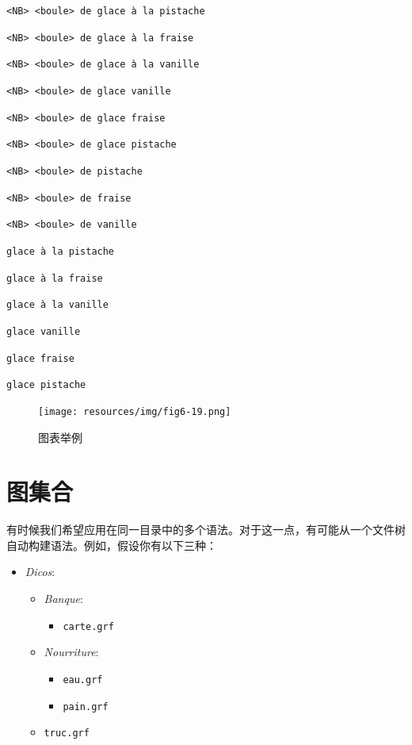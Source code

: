 \bigskip
\noindent
\texttt{<NB> <boule> de glace \`a la pistache}

\noindent
\texttt{<NB> <boule> de glace \`a la fraise}

\noindent
\texttt{<NB> <boule> de glace \`a la vanille}

\noindent
\texttt{<NB> <boule> de glace vanille}

\noindent
\texttt{<NB> <boule> de glace fraise}

\noindent
\texttt{<NB> <boule> de glace pistache}

\noindent
\texttt{<NB> <boule> de pistache}

\noindent
\texttt{<NB> <boule> de fraise}

\noindent
\texttt{<NB> <boule> de vanille}

\noindent
\texttt{glace \`a la pistache}

\noindent
\texttt{glace \`a la fraise}

\noindent
\texttt{glace \`a la vanille}

\noindent
\texttt{glace vanille}

\noindent
\texttt{glace fraise}

\noindent
\texttt{glace pistache}

\begin{figure}[!h]
\begin{center}
\texttt{[image: resources/img/fig6-19.png]}
\caption{图表举例 \label{fig-glace}}
\end{center}
\end{figure}




\section{图集合}

有时候我们希望应用在同一目录中的多个语法。对于这一点，有可能从一个文件树自动构建语法。例如，假设你有以下三种：


\begin{itemize}
  \item \textit{Dicos}:
  \begin{itemize}
    \item \textit{Banque}:
    \begin{itemize}
      \item \texttt{carte.grf}
    \end{itemize}
    \item \textit{Nourriture}:
    \begin{itemize}
      \item \texttt{eau.grf}
      \item \texttt{pain.grf}
    \end{itemize}
    \item \texttt{truc.grf}
  \end{itemize}
\end{itemize}

